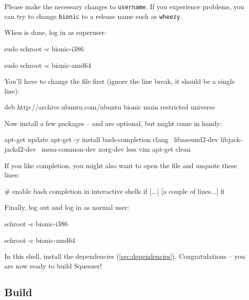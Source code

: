 Please make the necessary changes to \texttt{username}.  If you
experience problems, you can try to change \texttt{bionic} to a
release name such as \texttt{wheezy}.

When  is done, log in as superuser:

\begin{Verbatim32}
  sudo schroot -c bionic-i386
\end{Verbatim32}

\begin{Verbatim64}
  sudo schroot -c bionic-amd64
\end{Verbatim64}

You'll have to change the file  first
(ignore the line break, it should be a single line):

\begin{VerbatimBoth}
  deb http://archive.ubuntu.com/ubuntu bionic
  main restricted universe
\end{VerbatimBoth}

Now install a few packages --  and  are optional,
but might come in handy:

\begin{VerbatimBoth}
  apt-get update
  apt-get -y install bash-completion clang \
    libasound2-dev libjack-jackd2-dev \
    mesa-common-dev xorg-dev less vim
  apt-get clean
\end{VerbatimBoth}

If you like  completion, you might also want to open the
file  and unquote these lines:

\begin{VerbatimBoth}
  # enable bash completion in interactive shells
  if [...]
    [a couple of lines...]
  fi
\end{VerbatimBoth}

Finally, log out and log in as normal user:

\begin{Verbatim32}
  schroot -c bionic-i386
\end{Verbatim32}

\begin{Verbatim64}
  schroot -c bionic-amd64
\end{Verbatim64}

In this  shell, install the dependencies
(\ref{sec:dependencies}).  Congratulations -- you are now ready to
build Squeezer!

\subsection{Build}

